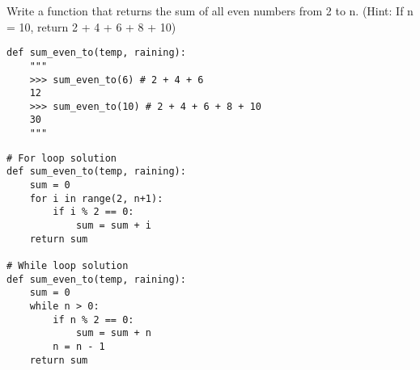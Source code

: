 \begin{blocksection}
\question Write a function that returns the sum of all even numbers from 2 to n. 
(Hint: If n = 10, return 2 + 4 + 6 + 8 + 10)

\begin{lstlisting}
def sum_even_to(temp, raining): 
    """
    >>> sum_even_to(6) # 2 + 4 + 6
    12
    >>> sum_even_to(10) # 2 + 4 + 6 + 8 + 10
    30
    """

\end{lstlisting}

\begin{solution}[1.5in]
\begin{lstlisting}
# For loop solution
def sum_even_to(temp, raining): 
    sum = 0
    for i in range(2, n+1):
        if i % 2 == 0:
            sum = sum + i
    return sum

# While loop solution
def sum_even_to(temp, raining): 
    sum = 0
    while n > 0:
        if n % 2 == 0:
            sum = sum + n
        n = n - 1
    return sum
\end{lstlisting}
\end{solution}
\end{blocksection}

